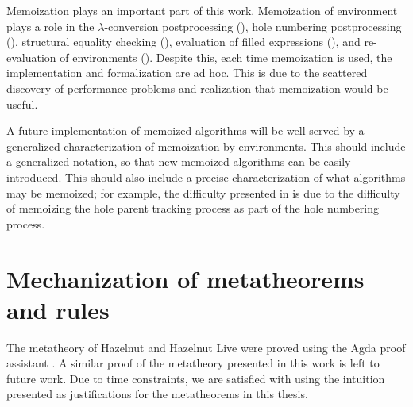 Memoization plays an important part of this work. Memoization of environment plays a role in the $\lambda$-conversion postprocessing (), hole numbering postprocessing (), structural equality checking (), evaluation of filled expressions (), and re-evaluation of environments (). Despite this, each time memoization is used, the implementation and formalization are ad hoc. This is due to the scattered discovery of performance problems and realization that memoization would be useful.

A future implementation of memoized algorithms will be well-served by a generalized characterization of memoization by environments. This should include a generalized notation, so that new memoized algorithms can be easily introduced. This should also include a precise characterization of what algorithms may be memoized; for example, the difficulty presented in  is due to the difficulty of memoizing the hole parent tracking process as part of the hole numbering process.

\section{Mechanization of metatheorems and rules}
\label{sec:formalization}

The metatheory of Hazelnut and Hazelnut Live were proved using the Agda proof assistant \cite{agda2017,agda-dynamics}. A similar proof of the metatheory presented in this work is left to future work. Due to time constraints, we are satisfied with using the intuition presented as justifications for the metatheorems in this thesis.

